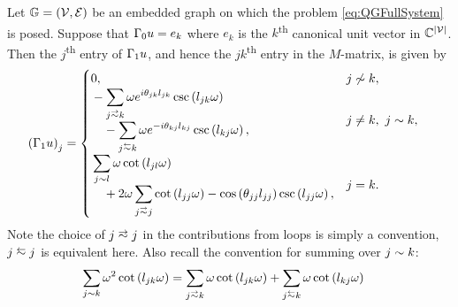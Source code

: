 \begin{prop} \label{prop:M-MatrixEntries}
	Let $\mathbb{G}=\left( \mathcal{V},\mathcal{E} \right)$ be an embedded graph on which the problem \eqref{eq:QGFullSystem} is posed.
	Suppose that $\Gamma_0 u = e_k$ where $e_k$ is the $k$\textsuperscript{th} canonical unit vector in $\mathbb{C}^{\left\lvert \mathcal{V} \right\rvert}$.
	Then the $j$\textsuperscript{th} entry of $\Gamma_1 u$, and hence the $jk$\textsuperscript{th} entry in the $M$-matrix, is given by
	\begin{align*}
		\bracs{\nmap u}_j &= 
		\begin{cases}
			\!\begin{aligned}
				&0,
			\end{aligned}			
			& j \not\con k, \\
			\!\begin{aligned}
				&-\sum_{j\conLeft k} \omega e^{i\qm_{jk}l_{jk}} \csc\bracs{l_{jk}\omega} 
				\\ &\quad - \sum_{j\conRight k} \omega e^{-i\qm_{kj}l_{kj}} \csc\bracs{l_{kj}\omega},
			\end{aligned}
			& j\neq k, \ j\con k, \\
			\!\begin{aligned}
				&\sum_{j\con l} \omega\cot\bracs{l_{jl}\omega}
				\\ &\quad + 2\omega\sum_{j\conLeft j} \cot\bracs{l_{jj}\omega} - \cos\bracs{\qm_{jj}l_{jj}}\csc\bracs{l_{jj}\omega},
			\end{aligned}
			& j=k.
		\end{cases}
	\end{align*}
	Note the choice of $j\conLeft j$ in the contributions from loops is simply a convention, $j\conRight j$ is equivalent here.
	Also recall the convention for summing over $j\sim k$:
	\begin{align*}
		\sum_{j\con k} \omega^2\cot\bracs{l_{jk}\omega} &= \sum_{j\conLeft k} \omega\cot\bracs{l_{jk}\omega}	+ \sum_{j\conRight k} \omega\cot\bracs{l_{kj}\omega}
	\end{align*}
\end{prop}
